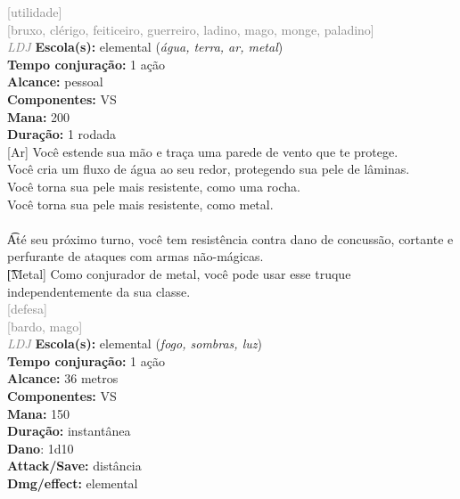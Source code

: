 \documentclass{RPG_Adventure}[2021/10/20]
\begin{document}
{\scriptsize \textcolor{gray}{[utilidade]\\}}
{\scriptsize \textcolor{gray}{[bruxo, clérigo, feiticeiro, guerreiro, ladino, mago, monge, paladino]\\}}
{\tiny \textcolor{gray}{\textit{LDJ}}}
{\small \t \textbf{Escola(s):} elemental (\textit{água, terra, ar, metal})\\\t \textbf{Tempo conjuração:} 1 ação\\\t \textbf{Alcance:} pessoal\\\t \textbf{Componentes:} VS\\\t \textbf{Mana:} 200\\\t \textbf{Duração:} 1 rodada\\}
{\normalsize [Ar] Você estende sua mão e traça uma parede de vento que te protege.\\[Água] Você cria um fluxo de água ao seu redor, protegendo sua pele de lâminas.\\[Terra] Você torna sua pele mais resistente, como uma rocha.\\[Metal] Você torna sua pele mais resistente, como metal.\\\\\t Até seu próximo turno, você tem resistência contra dano de concussão, cortante e perfurante de ataques com armas não-mágicas.\\\t [Metal] Como conjurador de metal, você pode usar esse truque independentemente da sua classe.\\}
{\scriptsize \textcolor{gray}{[defesa]\\}}
{\scriptsize \textcolor{gray}{[bardo, mago]\\}}
{\tiny \textcolor{gray}{\textit{LDJ}}}
{\small \t \textbf{Escola(s):} elemental (\textit{fogo, sombras, luz})\\\t \textbf{Tempo conjuração:} 1 ação\\\t \textbf{Alcance:} 36 metros\\\t \textbf{Componentes:} VS\\\t \textbf{Mana:} 150\\\t \textbf{Duração:} instantânea\\\t \textbf{Dano}: 1d10\\\t \textbf{Attack/Save:} distância\\\t \textbf{Dmg/effect:} elemental\\}
\end{document}
